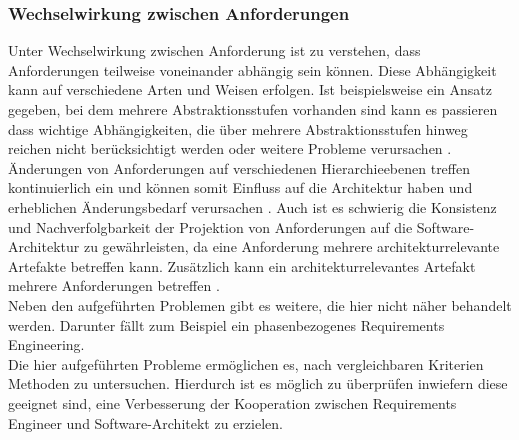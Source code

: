 \subsubsection{Wechselwirkung zwischen Anforderungen}
Unter Wechselwirkung zwischen Anforderung ist zu verstehen, dass Anforderungen teilweise voneinander abh\"angig sein k\"onnen. Diese Abh\"angigkeit kann auf verschiedene Arten und Weisen erfolgen. Ist beispielsweise ein Ansatz gegeben, bei dem mehrere Abstraktionsstufen vorhanden sind kann es passieren dass wichtige Abh\"angigkeiten, die \"uber mehrere Abstraktionsstufen hinweg reichen nicht ber\"ucksichtigt werden oder weitere Probleme verursachen \cite{Sik01}. \"Anderungen von Anforderungen auf verschiedenen Hierarchieebenen treffen kontinuierlich ein und k\"onnen somit Einfluss auf die Architektur haben und erheblichen \"Anderungsbedarf verursachen \cite{Zor01}. Auch ist es schwierig die Konsistenz und Nachverfolgbarkeit der Projektion von Anforderungen auf die Software-Architektur zu gew\"ahrleisten, da eine Anforderung mehrere architekturrelevante Artefakte betreffen kann. Zus\"atzlich kann ein architekturrelevantes Artefakt mehrere Anforderungen betreffen \cite{Gru01}.\\

Neben den aufgef\"uhrten Problemen gibt es weitere, die hier nicht n\"aher behandelt werden. Darunter f\"allt zum Beispiel ein phasenbezogenes Requirements Engineering.
\\

Die hier aufgef\"uhrten Probleme erm\"oglichen es, nach vergleichbaren Kriterien Methoden zu untersuchen. Hierdurch ist es m\"oglich zu \"uberpr\"ufen inwiefern diese geeignet sind, eine Verbesserung der Kooperation zwischen Requirements Engineer und Software-Architekt zu erzielen. \\
